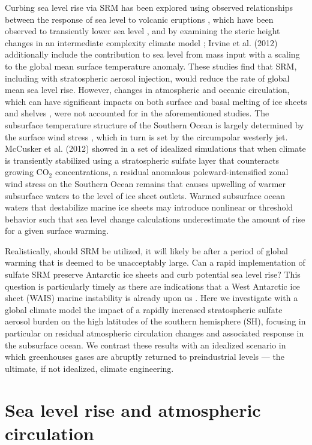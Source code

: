 \documentclass{nature}
\begin{document}
Curbing sea level rise via SRM has been explored using observed relationships between the response of sea level to volcanic eruptions \cite{moore10}, which have been observed to transiently lower sea level \cite{church05,gleckler06}, and by examining the steric height changes in an intermediate complexity climate model \cite{irvine12}; Irvine et al. (2012) additionally include the contribution to sea level from mass input with a scaling to the global mean surface temperature anomaly. These studies find that SRM, including with stratospheric aerosol injection, would reduce the rate of global mean sea level rise. However, changes in atmospheric and oceanic circulation, which can have significant impacts on both surface and basal melting of ice sheets and shelves \cite{steig13,joughin11,thoma08}, were not accounted for in the aforementioned studies. The subsurface temperature structure of the Southern Ocean is largely determined by the surface wind stress \cite{fyfe07}, which in turn is set by the circumpolar westerly jet. McCusker et al. (2012) showed in a set of idealized simulations that when climate is transiently stabilized using a stratospheric sulfate layer that counteracts growing CO$_2$ concentrations, a residual anomalous poleward-intensified zonal wind stress on the Southern Ocean remains that causes upwelling of warmer subsurface waters to the level of ice sheet outlets. Warmed subsurface ocean waters that destabilize marine ice sheets may introduce nonlinear or threshold behavior \cite{notz09} such that sea level change calculations underestimate the amount of rise for a given surface warming.

Realistically, should SRM be utilized, it will likely be after a period of global warming that is deemed to be unacceptably large. Can a rapid implementation of sulfate SRM preserve Antarctic ice sheets and curb potential sea level rise? This question is particularly timely as there are indications that a West Antarctic ice sheet (WAIS) marine instability is already upon us \cite{favier14,rignot14}. Here we investigate with a global climate model the impact of a rapidly increased stratospheric sulfate aerosol burden on the high latitudes of the southern hemisphere (SH), focusing in particular on residual atmospheric circulation changes and associated response in the subsurface ocean. We contrast these results with an idealized scenario in which greenhouses gases are abruptly returned to preindustrial levels --- the ultimate, if not idealized, climate engineering. 

\section{Sea level rise and atmospheric circulation}
\end{document}
